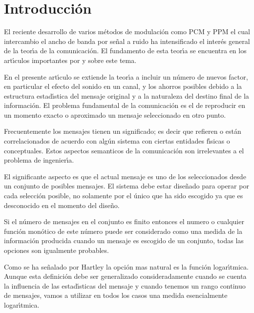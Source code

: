 \chapter*{Introducci\'{o}n}

El reciente desarrollo de varios m\'{e}todos de modulaci\'{o}n como
PCM y PPM el cual intercambio el ancho de banda por se\~{n}al a ruido
ha intensificado el inter\'{e}s general de la teor\'{\i}a de la
comunicaci\'{o}n. El fundamento de esta teor\'{\i}a se encuentra en
los art\'{\i}culos importantes por \citet{Nyquist} y \citet{Hartley}
sobre este tema.

En el presente art\'{\i}culo se extiende la teor\'{\i}a a incluir un
n\'{u}mero de nuevos factor, en particular el efecto del sonido en un
canal, y los ahorros posibles debido a la estructura estad\'{\i}stica
del mensaje original y a la naturaleza del destino final de la
informaci\'{o}n. El problema fundamental de la comunicaci\'{o}n es el
de reproducir en un momento exacto o aproximado un mensaje
seleccionado en otro punto.

Frecuentemente los mensajes tienen un significado; es decir que
refieren o est\'{a}n correlacionados de acuerdo con alg\'{u}n sistema con
ciertas entidades f\'{\i}sicas o conceptuales. Estos aspectos
semanticos de la comunicaci\'{o}n son irrelevantes a el problema de
ingenier\'{\i}a.

El significante aspecto es que el actual mensaje es uno de los
seleccionados desde un conjunto de posibles mensajes. El sistema debe
estar dise\~{n}ado para operar por cada selecci\'{o}n posible, no
solamente por el \'{u}nico que ha sido escogido ya que es desconocido
en el momento del dise\~{n}o.

Si el n\'{u}mero de mensajes en el conjunto es finito entonces el
numero o cualquier funci\'{o}n mon\'{o}tico de este n\'{u}mero puede
ser considerado como una medida de la informaci\'{o}n producida cuando
un mensaje es escogido de un conjunto, todas las opciones son
igualmente probables.

Como se ha se\~{n}alado por Hartley la opci\'{o}n mas natural es la
funci\'{o}n logar\'{\i}tmica. Aunque esta definici\'{o}n debe ser
generalizado consideradamente cuando se cuenta la influencia de las
estad\'{\i}sticas del mensaje y cuando tenemos un rango continuo de
mensajes, vamos a utilizar en todos los casos una medida esencialmente
logar\'{\i}tmica.


